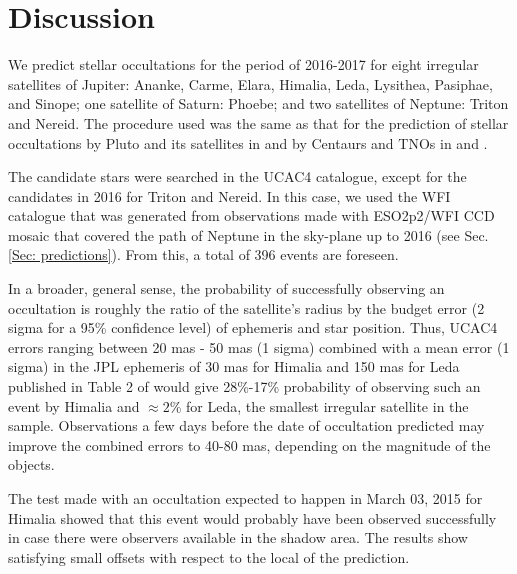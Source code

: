 \section{Discussion} \label{Sec: discussion}

We predict stellar occultations for the period of 2016-2017 for eight irregular satellites of Jupiter: Ananke, Carme, Elara, Himalia, Leda, Lysithea, Pasiphae, and Sinope; one satellite of Saturn: Phoebe; and two satellites of Neptune: Triton and Nereid. The procedure used was the same as that for the prediction of stellar occultations by Pluto and its satellites in \cite{Assafin2010} and by Centaurs and TNOs in \cite{Assafin2012} and \cite{Camargo2014}.

The candidate stars were searched in the UCAC4 catalogue, except for the candidates in 2016 for Triton and Nereid. In this case, we used the WFI catalogue that was generated from observations made with ESO2p2/WFI CCD mosaic that covered the path of Neptune in the sky-plane up to 2016 (see Sec. \ref{Sec: predictions}). From this, a total of 396 events are foreseen. 

In a broader, general sense, the probability of successfully observing an occultation is roughly the ratio of the satellite's radius by the budget error (2 sigma for a 95\% confidence level) of ephemeris and star position. Thus, UCAC4 errors ranging between 20 mas - 50 mas (1 sigma) combined with a mean error (1 sigma) in the JPL ephemeris of 30 mas for Himalia and 150 mas for Leda published in Table 2 of \cite{Jacobson2012} would give 28\%-17\% probability of observing such an event by Himalia and $\approx2$\% for Leda, the smallest irregular satellite in the sample. Observations a few days before the date of occultation predicted may improve the combined errors to 40-80 mas, depending on the magnitude of the objects.

The test made with an occultation expected to happen in March 03, 2015 for Himalia showed that this event would probably have been observed successfully in case there were observers available in the shadow area. %
The results show satisfying small offsets with respect to the local of the prediction. %

